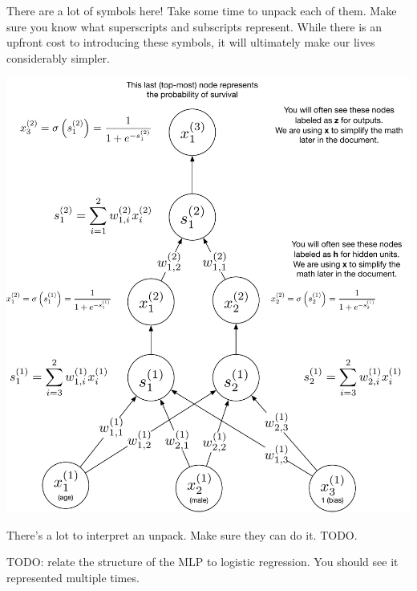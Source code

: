 \documentclass[assignment06_Solutions]{subfiles}
\begin{document}
\begin{notice}
There are a lot of symbols here!  Take some time to unpack each of them.  Make sure you know what superscripts and subscripts represent.  While there is an upfront cost to introducing these symbols, it will ultimately make our lives considerably simpler.
\end{notice}
\includegraphics[width=\linewidth]{figures/titanicmlp}

\vspace{1em}

\begin{exercise}
There's a lot to interpret an unpack.  Make sure they can do it. TODO.
\bes
\item TODO: relate the structure of the MLP to logistic regression.  You should see it represented multiple times.
\ees
\end{exercise}
\end{document}
